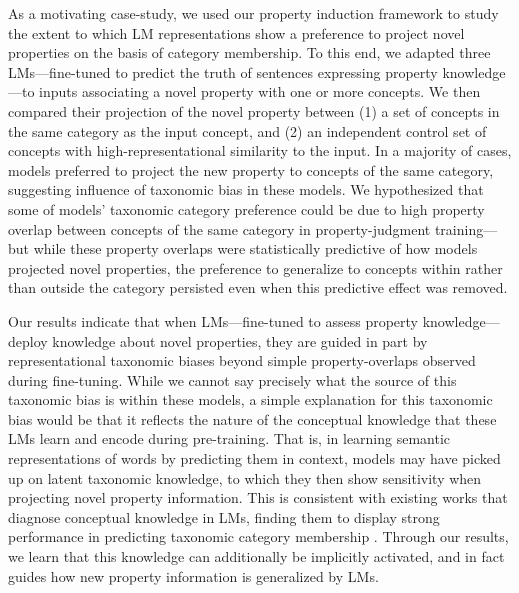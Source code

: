 \documentclass[10pt,letterpaper]{article}
\begin{document}
As a motivating case-study, we used our property induction framework to study the extent to which LM representations show a preference to project novel properties on the basis of category membership. 
To this end, we adapted three LMs---fine-tuned to predict the truth of sentences expressing property knowledge---to inputs associating a novel property with one or more concepts. We then compared their projection of the novel property between (1) a set of concepts in the same category as the input concept, and (2) an independent control set of concepts with high-representational similarity to the input.
In a majority of cases, models preferred to project the new property to concepts of the same category, suggesting influence of taxonomic bias in these models. 
We hypothesized that some of models' taxonomic category preference could be due to high property overlap between concepts of the same category in property-judgment training---but while these property overlaps were statistically predictive of how models projected novel properties, the preference to generalize to concepts within rather than outside the category persisted even when this predictive effect was removed.

Our results indicate that when LMs---fine-tuned to assess property knowledge---deploy knowledge about novel properties, they are guided in part by representational taxonomic biases beyond simple property-overlaps observed during fine-tuning. While we cannot say precisely what the source of this taxonomic bias is within these models, a simple explanation for this taxonomic bias would be that it reflects the nature of the conceptual knowledge that these LMs learn and encode during pre-training. That is, in learning semantic representations of words by predicting them in context, models may have picked up on latent taxonomic knowledge, to which they then show sensitivity when projecting novel property information. 
This is consistent with existing works that diagnose  conceptual knowledge in LMs, finding them to display strong performance in predicting taxonomic category membership \citep{da-kasai-2019-cracking, weir2020probing, bhatia2020transformer}. 
Through our results, we learn that this knowledge can additionally be implicitly activated, and in fact guides how new property information is generalized by LMs.
\end{document}
